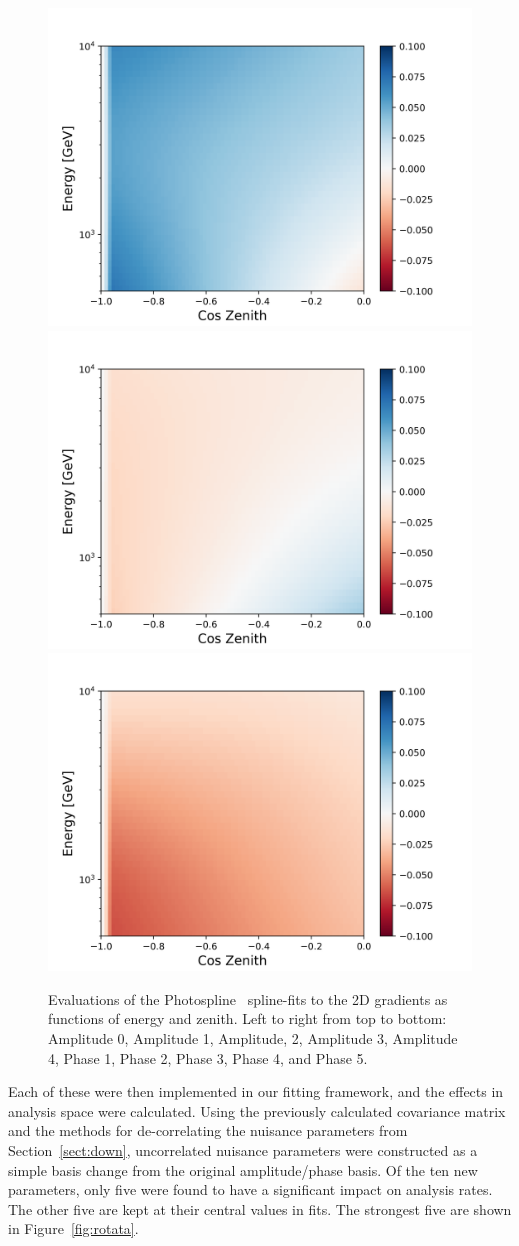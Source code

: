 \documentclass[main.tex]{subfiles}
\begin{document}
\begin{figure}
    \includegraphics[width=0.24\linewidth]{figures/spline_phase03_gradient.png}\\
    \includegraphics[width=0.24\linewidth]{figures/spline_phase04_gradient.png}%
    \includegraphics[width=0.24\linewidth]{figures/spline_phase05_gradient.png}%
    \caption{Evaluations of the Photospline~\cite{WHITEHORN20132214} spline-fits to the 2D gradients as functions of energy and zenith. Left to right from top to bottom: Amplitude 0, Amplitude 1, Amplitude, 2, Amplitude 3, Amplitude 4, Phase 1, Phase 2, Phase 3, Phase 4, and Phase 5.}\label{fig:gradients}
\end{figure}

Each of these were then implemented in our fitting framework, and the effects in analysis space were calculated. 
Using the previously calculated covariance matrix and the methods for de-correlating the nuisance parameters from Section~\ref{sect:down}, uncorrelated nuisance parameters were constructed as a simple basis change from the original amplitude/phase basis. 
Of the ten new parameters, only five were found to have a significant impact on analysis rates. The other five are kept at their central values in fits. 
The strongest five are shown in Figure~\ref{fig:rotata}.
\end{document}
